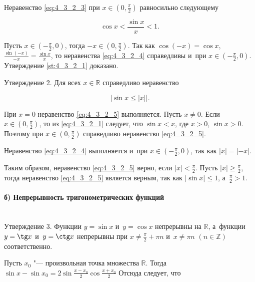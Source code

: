 Неравенство \eqref{eq:4_3_2_3} при $\displaystyle x \in \left( 0, \frac{\pi}{2} \right)$
равносильно следующему

\begin{equation}\label{eq:4_3_2_4}
\displaystyle \cos x < \frac{\sin x}{x} < 1.
\end{equation}

\noindent
Пусть $\displaystyle x \in \left( -\frac{\pi}{2}, 0 \right)$,
тогда $\displaystyle -x \in \left( 0, \frac{\pi}{2} \right)$.
Так как $\cos (-x) = \cos x$, $\displaystyle \frac{\sin (-x)}{-x} = \frac{\sin x}{x}$,
то неравенства \eqref{eq:4_3_2_4} справедливы
и~при $\displaystyle x \in \left( -\frac{\pi}{2}, 0\right)$.
Утверждение \eqref{st:4_3_2_1} доказано.

Утверждение 2.\label{st:4_3_2_2} Для всех $x \in \mathbb{R}$ справедливо неравенство

\begin{equation}\label{eq:4_3_2_5}
\left|
\sin x \leqslant |x|
\right|.
\end{equation}

При $x = 0$ неравенство \eqref{eq:4_3_2_5} выполняется. Пусть $x \ne 0$.
Если $\displaystyle x \in \left( 0, \frac{\pi}{2} \right)$,
то из \eqref{eq:4_3_2_1} следует, что $\sin x < x$, где $x > 0$, $\sin x > 0$.
Поэтому при $x \in \left( 0, \frac{\pi}{2} \right)$ справедливо неравенство \eqref{eq:4_3_2_5}.

Неравенство \eqref{eq:4_3_2_4} выполняется и~при
$\displaystyle x \in \left( -\frac{\pi}{2}, 0 \right)$, так как $|x| = |-x|$.

Таким образом, неравенство \eqref{eq:4_3_2_5} верно, если $\displaystyle |x| < \frac{\pi}{2}$.
Пусть $\displaystyle |x| \geqslant \frac{\pi}{2}$,
тогда неравенство \eqref{eq:4_3_2_5} является верным,
так как $\left| \sin x \right| \leqslant 1$, а~$\displaystyle \frac{\pi}{2} > 1$.

\paragraph{б) Непрерывность тригонометрических функций}\mbox{} \\

Утверждение 3.\label{st:4_3_2_3}
Функции $y = \sin x$ и~$y = \cos x$ непрерывны на $\mathbb{R}$,
а~функции $y = \tg x$ и~$y = \ctg x$ непрерывны при
$\displaystyle x \ne \frac{\pi}{2} + \pi n$ и~$x \ne \pi n$ \; $(n \in \mathbb{Z})$
соответственно.

Пусть $x_{0}$ "--- произвольная точка множества $\mathbb{R}$.
Тогда $\displaystyle \sin x - \sin x_{0} = 2 \sin\frac{x-x_{0}}{2} \cos\frac{x+x_{0}}{2}$
Отсюда следует, что

